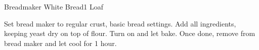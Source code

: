 \begin{recipe}{Breadmaker White Bread}{1 Loaf}{}


    Set bread maker to regular crust, basic bread settings. Add all ingredients, keeping yeast dry on top of flour. Turn on and let bake. Once done, remove from bread maker and let cool for 1 hour.
\end{recipe}